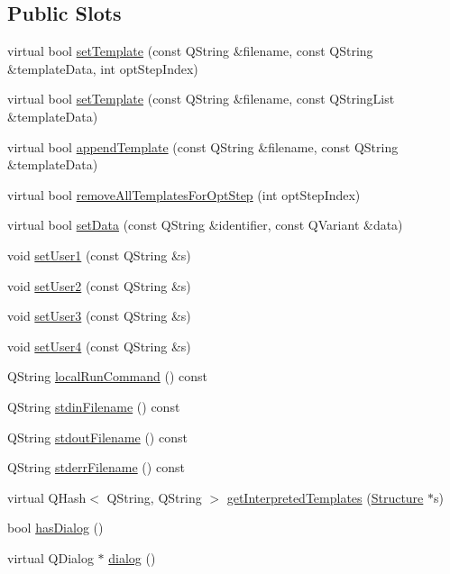 \subsection*{Public Slots}
\begin{DoxyCompactItemize}
\item 
virtual bool \hyperlink{classGlobalSearch_1_1Optimizer_a83db0ac69c8b97825fc5d8361107ada4}{set\-Template} (const Q\-String \&filename, const Q\-String \&template\-Data, int opt\-Step\-Index)
\item 
virtual bool \hyperlink{classGlobalSearch_1_1Optimizer_ab4be28b4fc40d106ffa5ae1c9d67a6f3}{set\-Template} (const Q\-String \&filename, const Q\-String\-List \&template\-Data)
\item 
virtual bool \hyperlink{classGlobalSearch_1_1Optimizer_a8734827ff8773648cf4da48988208d87}{append\-Template} (const Q\-String \&filename, const Q\-String \&template\-Data)
\item 
virtual bool \hyperlink{classGlobalSearch_1_1Optimizer_a894c2cc508b92f2bb1678cc750faab30}{remove\-All\-Templates\-For\-Opt\-Step} (int opt\-Step\-Index)
\item 
virtual bool \hyperlink{classGlobalSearch_1_1Optimizer_a0bea17818fd8f29a13542119aebf2377}{set\-Data} (const Q\-String \&identifier, const Q\-Variant \&data)
\item 
void \hyperlink{classGlobalSearch_1_1Optimizer_adfb8a9de9d1eac7d5b188f6ae24c5ebc}{set\-User1} (const Q\-String \&s)
\item 
void \hyperlink{classGlobalSearch_1_1Optimizer_a9f53a4945abb35cda9a50fb973d27890}{set\-User2} (const Q\-String \&s)
\item 
void \hyperlink{classGlobalSearch_1_1Optimizer_a19e2d3e7c7a31f1ae94a3a58c0b3a6bf}{set\-User3} (const Q\-String \&s)
\item 
void \hyperlink{classGlobalSearch_1_1Optimizer_a713a94a031fc5fa7c653d54e6ef9fb64}{set\-User4} (const Q\-String \&s)
\item 
Q\-String \hyperlink{classGlobalSearch_1_1Optimizer_aed5eb285d45a001c9520c2ed3a5b57a1}{local\-Run\-Command} () const 
\item 
Q\-String \hyperlink{classGlobalSearch_1_1Optimizer_a5964a9b38d3ae90c8ac36a75d3a35832}{stdin\-Filename} () const 
\item 
Q\-String \hyperlink{classGlobalSearch_1_1Optimizer_a217750aa50431f9948aa8164fb99de0c}{stdout\-Filename} () const 
\item 
Q\-String \hyperlink{classGlobalSearch_1_1Optimizer_acaa83cc6bf1dcc263b92450b4f8cb652}{stderr\-Filename} () const 
\item 
virtual Q\-Hash$<$ Q\-String, Q\-String $>$ \hyperlink{classGlobalSearch_1_1Optimizer_aaaa0f0c28058c716fc065b48090c321f}{get\-Interpreted\-Templates} (\hyperlink{classGlobalSearch_1_1Structure}{Structure} $\ast$s)
\item 
bool \hyperlink{group__dialog_gac4335196cdf08e3555f6d0e152761604}{has\-Dialog} ()
\item 
virtual Q\-Dialog $\ast$ \hyperlink{group__dialog_ga9455d181accc40edd3ca6271fdc1e050}{dialog} ()
\end{DoxyCompactItemize}
